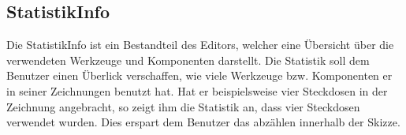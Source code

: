 \subsection{StatistikInfo}
Die StatistikInfo ist ein Bestandteil des Editors, welcher eine Übersicht über die verwendeten Werkzeuge und Komponenten darstellt. Die Statistik soll dem Benutzer einen Überlick verschaffen, wie viele Werkzeuge bzw. Komponenten er in seiner Zeichnungen benutzt hat. Hat er beispielsweise vier Steckdosen in der Zeichnung angebracht, so zeigt ihm die Statistik an, dass vier Steckdosen verwendet wurden. Dies erspart dem Benutzer das abzählen innerhalb der Skizze.


